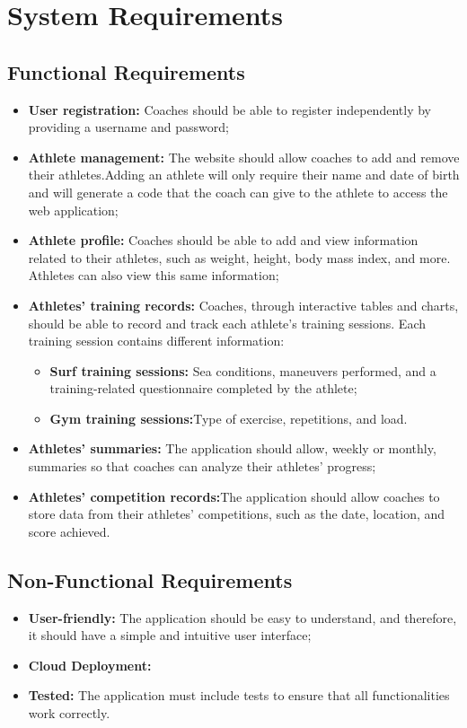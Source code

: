\documentclass[a4paper,twoside,11pt]{article}
\begin{document}
\section{System Requirements}
\subsection{Functional Requirements}
\begin{itemize}
\item \textbf{User registration:} Coaches should be able to register independently by providing a username and password;
\item \textbf{Athlete management:} The website should allow coaches to add and remove their athletes.Adding an athlete will only require their name and date of birth and will generate a code that the coach can give to the athlete to access the web application;
\item \textbf{Athlete profile:} Coaches should be able to add and view information related to their athletes, such as weight, height, body mass index, and more. Athletes can also view this same information;
\item \textbf{Athletes' training records:} Coaches, through interactive tables and charts, should be able to record and track each athlete's training sessions. Each training session contains different information:
\begin{itemize}
\item \textbf{Surf training sessions:} Sea conditions, maneuvers performed, and a training-related questionnaire completed by the athlete;
\item \textbf{Gym training sessions:}Type of exercise, repetitions, and load.
\end{itemize}
\item \textbf{Athletes' summaries:} The application should allow, weekly or monthly, summaries so that coaches can analyze their athletes' progress;
\item \textbf{Athletes' competition records:}The application should allow coaches to store data from their athletes' competitions, such as the date, location, and score achieved.
\end{itemize}
\subsection{Non-Functional Requirements}
\begin{itemize}
\item \textbf{User-friendly:} The application should be easy to understand, and therefore, it should have a simple and intuitive user interface;
\item \textbf{Cloud Deployment:}
\item \textbf{Tested:} The application must include tests to ensure that all functionalities work correctly.
\end{itemize}
\end{document}
